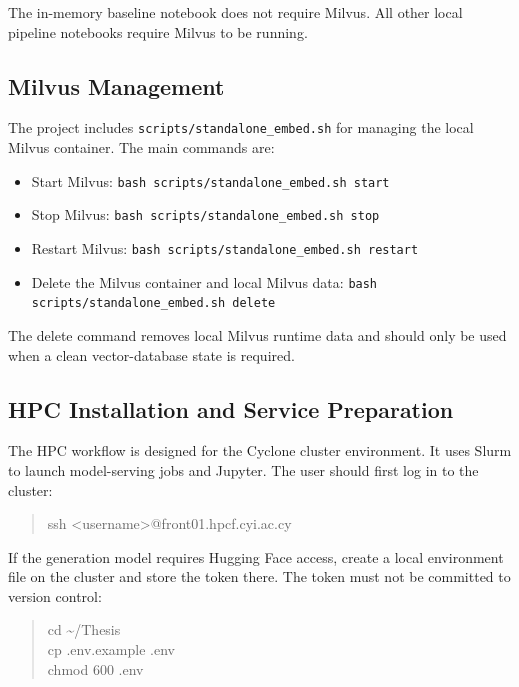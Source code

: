 The in-memory baseline notebook does not require Milvus. All other local pipeline notebooks require Milvus to be running.

\subsection*{Milvus Management}

The project includes \texttt{scripts/standalone\_embed.sh} for managing the local Milvus container. The main commands are:

\begin{itemize}
    \item Start Milvus: \texttt{bash scripts/standalone\_embed.sh start}
    \item Stop Milvus: \texttt{bash scripts/standalone\_embed.sh stop}
    \item Restart Milvus: \texttt{bash scripts/standalone\_embed.sh restart}
    \item Delete the Milvus container and local Milvus data: \texttt{bash scripts/standalone\_embed.sh delete}
\end{itemize}

The delete command removes local Milvus runtime data and should only be used when a clean vector-database state is required.

\subsection*{HPC Installation and Service Preparation}

The \ac{HPC} workflow is designed for the Cyclone cluster environment. It uses Slurm to launch model-serving jobs and Jupyter. The user should first log in to the cluster:

\begin{quote}
\small\ttfamily
ssh <username>@front01.hpcf.cyi.ac.cy
\end{quote}

If the generation model requires Hugging Face access, create a local environment file on the cluster and store the token there. The token must not be committed to version control:

\begin{quote}
\small\ttfamily
cd \textasciitilde/Thesis\\
cp .env.example .env\\
chmod 600 .env
\end{quote}

